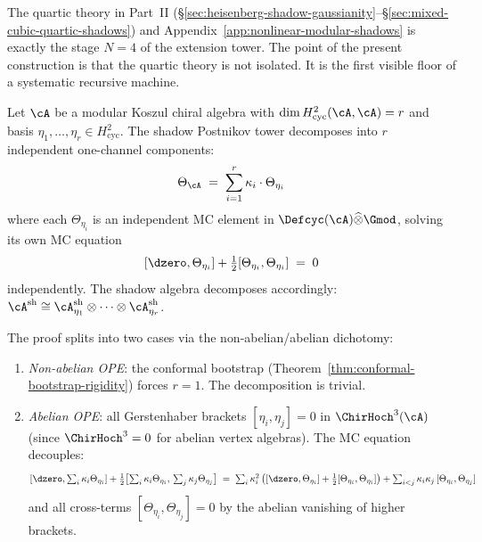 \begin{remark}
The quartic theory in Part~II
(\S\ref{sec:heisenberg-shadow-gaussianity}--\S\ref{sec:mixed-cubic-quartic-shadows})
and Appendix~\ref{app:nonlinear-modular-shadows}
is exactly the stage $N = 4$ of the extension tower.  The point of
the present construction is that the quartic theory is not isolated.
It is the first visible floor of a systematic recursive machine.
\end{remark}

\begin{theorem}
\label{thm:shadow-channel-decomposition}
Let $\cA$ be a modular Koszul chiral algebra with
$\dim H^2_{\mathrm{cyc}}(\cA, \cA) = r$ and basis
$\eta_1, \ldots, \eta_r \in H^2_{\mathrm{cyc}}$.
The shadow Postnikov tower decomposes into $r$ independent
one-channel components:
\begin{equation}\label{eq:shadow-channel-decomposition}
\Theta_{\cA}
\;=\; \sum_{i=1}^r \kappa_i \cdot \Theta_{\eta_i}
\end{equation}
where each $\Theta_{\eta_i}$ is an independent MC element in
$\Defcyc(\cA) \widehat\otimes \Gmod$, solving its own MC equation
\begin{equation}\label{eq:per-channel-mc}
[\dzero, \Theta_{\eta_i}]
+ \tfrac{1}{2}[\Theta_{\eta_i}, \Theta_{\eta_i}]
\;=\; 0
\end{equation}
independently.  The shadow algebra decomposes accordingly:
$\cA^{\mathrm{sh}} \cong
\cA^{\mathrm{sh}}_{\eta_1} \otimes \cdots
\otimes \cA^{\mathrm{sh}}_{\eta_r}$.

The proof splits into two cases via the non-abelian/abelian
dichotomy:
\begin{enumerate}[label=\textup{(\alph*)}]
\item \emph{Non-abelian OPE}: the conformal bootstrap
  \textup{(}Theorem~\textup{\ref{thm:conformal-bootstrap-rigidity}}\textup{)}
  forces $r = 1$.  The decomposition is trivial.
\item \emph{Abelian OPE}: all Gerstenhaber brackets
  $[\eta_i, \eta_j] = 0$ in $\ChirHoch^3(\cA)$
  \textup{(}since $\ChirHoch^3 = 0$ for abelian vertex
  algebras\textup{)}.  The MC equation decouples:
  \[
  [\dzero, \textstyle\sum_i \kappa_i \Theta_{\eta_i}]
  + \tfrac{1}{2}\bigl[\textstyle\sum_i \kappa_i \Theta_{\eta_i},\,
    \textstyle\sum_j \kappa_j \Theta_{\eta_j}\bigr]
  \;=\; \sum_i \kappa_i^2\,
  \bigl([\dzero, \Theta_{\eta_i}]
  + \tfrac{1}{2}[\Theta_{\eta_i}, \Theta_{\eta_i}]\bigr)
  + \sum_{i < j} \kappa_i \kappa_j\,
  [\Theta_{\eta_i}, \Theta_{\eta_j}]
  \]
  and all cross-terms $[\Theta_{\eta_i}, \Theta_{\eta_j}] = 0$
  by the abelian vanishing of higher brackets.
\end{enumerate}
\end{theorem}

